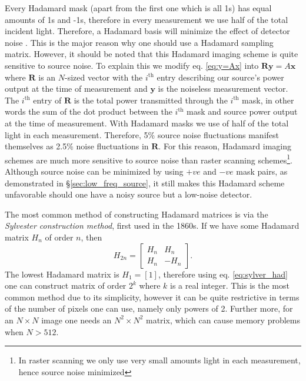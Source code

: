 Every Hadamard mask (apart from the first one which is all 1s) has equal amounts of 1s and -1s, therefore in every measurement we use half of the total incident light. Therefore, a Hadamard basis will minimize the effect of detector noise \cite{H_optics}. This is the major reason why one should use a Hadamard sampling matrix. However, it should be noted that this Hadamard imaging scheme is quite sensitive to source noise. To explain this we modify eq. \eqref{eq:y=Ax} into $\mathbf{Ry}=A\mathbf{x}$ where $\mathbf{R}$ is an $N$-sized vector with the $i^{\text{th}}$ entry describing our source's power output at the time of measurement and $\mathbf{y}$ is the noiseless measurement vector. The $i^{\text{th}}$ entry of $\mathbf{R}$ is the total power transmitted through the $i^{\text{th}}$ mask, in other words the sum of the dot product between the $i^{\text{th}}$ mask and source power output at the time of measurement. With Hadamard masks we use of half of the total light in each measurement. Therefore, 5\% source noise fluctuations manifest themselves as 2.5\% noise fluctuations in $\mathbf{R}$.  For this reason, Hadamard imaging schemes are much more sensitive to source noise than raster scanning schemes\footnote{In raster scanning we only use very small amounts light in each measurement, hence source noise minimized}. Although source noise can be minimized by using $+ve$ and $-ve$ mask pairs, as demonstrated in \S\ref{sec:low_freq_source}, it still makes this Hadamard scheme unfavorable should one have a noisy source but a low-noise detector.

The most common method of constructing Hadamard matrices is via the \textit{Sylvester construction method}, first used in the 1860s. If we have some Hadamard matrix $H_n$ of order $n$, then 
\begin{equation}
H_{2n}=\left[{\begin{array}{cc}H_n & H_n \\ H_n & -H_n \end{array} }\right].
\label{eq:sylver_had}
\end{equation}
The lowest Hadamard matrix is $H_1=[1]$, therefore using eq. \eqref{eq:sylver_had} one can construct matrix of order $2^k$ where $k$ is a real integer. This is the most common method due to its simplicity, however it can be quite restrictive in terms of the number of pixels one can use, namely only powers of 2. Further more, for an $N \times N$ image one needs an $N^2 \times N^2$ matrix, which can cause memory problems when $N>512$. 

